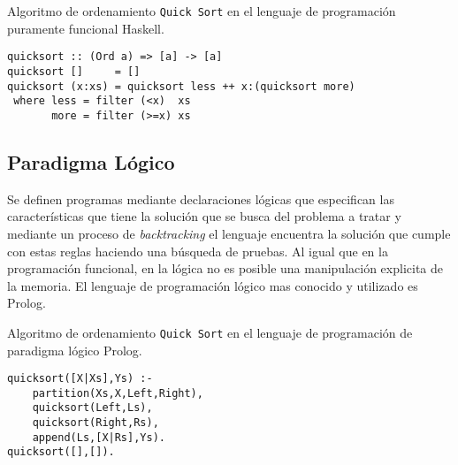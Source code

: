 \documentclass[12pt]{extarticle}
\begin{document}
\begin{example}
Algoritmo de ordenamiento {\tt Quick Sort} en el lenguaje de programación puramente funcional {\sf Haskell}.
    \begin{code2}
    \begin{verbatim}
quicksort :: (Ord a) => [a] -> [a]
quicksort []     = []
quicksort (x:xs) = quicksort less ++ x:(quicksort more)
 where less = filter (<x)  xs
       more = filter (>=x) xs
    \end{verbatim}
    \end{code2}
\end{example}
\subsection{Paradigma Lógico}
Se definen programas mediante declaraciones lógicas que especifican las características que tiene la solución que se busca del problema a tratar y mediante un proceso de {\it backtracking} el lenguaje encuentra la solución que cumple con estas reglas haciendo una búsqueda de pruebas. Al igual que en la programación funcional, en la lógica no es posible una manipulación explicita de la memoria. El lenguaje de programación lógico mas conocido y utilizado es {\sf Prolog}.
\begin{example}
Algoritmo de ordenamiento {\tt Quick Sort} en el lenguaje de programación de paradigma lógico {\sf Prolog}.
    \begin{code2}
\begin{verbatim}
quicksort([X|Xs],Ys) :-
    partition(Xs,X,Left,Right),
    quicksort(Left,Ls),
    quicksort(Right,Rs),
    append(Ls,[X|Rs],Ys).
quicksort([],[]).
    \end{verbatim}
    \end{code2}
\end{example}
\end{document}
